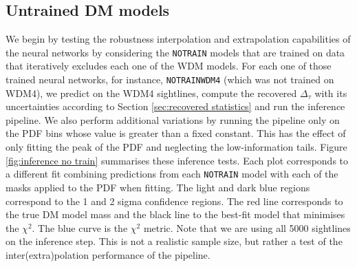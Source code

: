 \subsection{Untrained DM models}
We begin by testing the robustness interpolation and extrapolation capabilities of the neural networks by considering the \texttt{NOTRAIN} models that are trained on data that iteratively excludes each one of the WDM models. For each one of those trained neural networks, for instance, \texttt{NOTRAINWDM4} (which was not trained on WDM4), we predict on the WDM4 sightlines, compute the recovered $\Delta_\tau$ with its uncertainties according to Section \ref{sec:recovered statistics} and run the inference pipeline. We also perform additional variations by running the pipeline only on the PDF bins whose value is greater than a fixed constant. This has the effect of only fitting the peak of the PDF and neglecting the low-information tails. Figure \ref{fig:inference no train} summarises these inference tests. Each plot corresponds to a different fit combining predictions from each \texttt{NOTRAIN} model with each of the masks applied to the PDF when fitting. The light and dark blue regions correspond to the 1 and 2 sigma confidence regions. The red line corresponds to the true DM model mass and the black line to the best-fit model that minimises the $\chi^2$. The blue curve is the $\chi^2$ metric. Note that we are using all 5000 sightlines on the inference step. This is not a realistic sample size, but rather a test of the inter(extra)polation performance of the pipeline.


